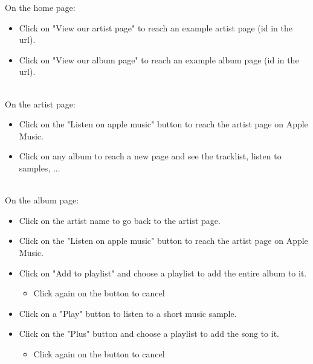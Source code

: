\documentclass[11pt]{article}
\begin{document}
		\noindent
		On the home page:
		\begin{itemize}
		\item Click on "View our artist page" to reach an example artist page (id in the url).
		\item Click on "View our album page" to reach an example album page (id in the url).
		\end{itemize}

		\noindent \\
		On the artist page:
		\begin{itemize}
        \item Click on the "Listen on apple music" button to reach the artist page on Apple Music.
        \item Click on any album to reach a new page and see the tracklist, listen to samples, ...
        \end{itemize}

        \noindent \\
        On the album page:
        \begin{itemize}
        \item Click on the artist name to go back to the artist page.
        \item Click on the "Listen on apple music" button to reach the artist page on Apple Music.
        \item Click on "Add to playlist" and choose a playlist to add the entire album to it.
            \begin{itemize}
            \item Click again on the button to cancel
            \end{itemize}
        \item Click on a "Play" button to listen to a short music sample.
        \item Click on the "Plus" button and choose a playlist to add the song to it.
            \begin{itemize}
            \item Click again on the button to cancel
            \end{itemize}
        \end{itemize}
        
\end{document}
